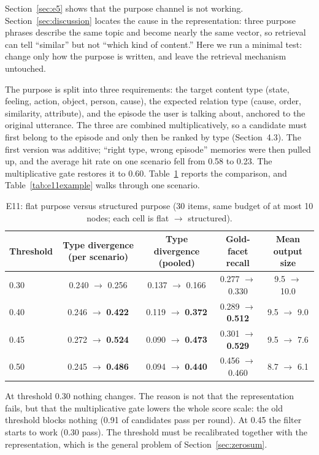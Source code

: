 \documentclass[11pt]{article}
\begin{document}
Section~\ref{sec:e5} shows that the purpose channel is not working. Section~\ref{sec:discussion}
locates the cause in the representation: three purpose phrases describe the same topic and become
nearly the same vector, so retrieval can tell ``similar'' but not ``which kind of content.''
Here we run a minimal test: change only how the purpose is written, and leave the retrieval
mechanism untouched.

The purpose is split into three requirements: the target content type (state, feeling, action,
object, person, cause), the expected relation type (cause, order, similarity, attribute), and the
episode the user is talking about, anchored to the original utterance. The three are combined
multiplicatively, so a candidate must first belong to the episode and only then be ranked by type
(Section~4.3). The first version was additive; ``right type, wrong episode'' memories were then
pulled up, and the average hit rate on one scenario fell from 0.58 to 0.23. The multiplicative
gate restores it to 0.60. Table~\ref{tab:e11} reports the comparison, and
Table~\ref{tab:e11example} walks through one scenario.

\begin{table}[t]
  \centering
  \small
  \begin{tabular}{@{}lcccc@{}}
    \toprule
    Threshold & Type divergence (per scenario) & Type divergence (pooled)
              & Gold-facet recall & Mean output size \\
    \midrule
    0.30 & 0.240 $\rightarrow$ 0.256 & 0.137 $\rightarrow$ 0.166 & 0.277 $\rightarrow$ 0.330 & 9.5 $\rightarrow$ 10.0 \\
    0.40 & 0.246 $\rightarrow$ \textbf{0.422} & 0.119 $\rightarrow$ \textbf{0.372} & 0.289 $\rightarrow$ \textbf{0.512} & 9.5 $\rightarrow$ 9.0 \\
    0.45 & 0.272 $\rightarrow$ \textbf{0.524} & 0.090 $\rightarrow$ \textbf{0.473} & 0.301 $\rightarrow$ \textbf{0.529} & 9.5 $\rightarrow$ 7.6 \\
    0.50 & 0.245 $\rightarrow$ \textbf{0.486} & 0.094 $\rightarrow$ \textbf{0.440} & 0.456 $\rightarrow$ 0.460 & 8.7 $\rightarrow$ 6.1 \\
    \bottomrule
  \end{tabular}
  \caption{E11: flat purpose versus structured purpose (30 items, same budget of at most 10
  nodes; each cell is flat $\rightarrow$ structured).}\label{tab:e11}
\end{table}

At threshold 0.30 nothing changes. The reason is not that the representation fails, but that the
multiplicative gate lowers the whole score scale: the old threshold blocks nothing (0.91 of
candidates pass per round). At 0.45 the filter starts to work (0.30 pass). The threshold must be
recalibrated together with the representation, which is the general problem of
Section~\ref{sec:zerosum}.
\end{document}
